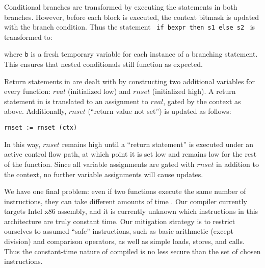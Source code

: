Conditional branches are transformed by executing the statements in both
branches. However, before each block is executed, the context bitmask is updated
with the branch condition. Thus the statement ~\texttt{if bexpr then s1 else
s2}~ is transformed to:
\begin{center}
\end{center}
where \texttt{b} is a fresh temporary variable for each instance of a branching
statement. This ensures that nested conditionals still function as expected.

Return statements in \constc are dealt with by constructing two additional
variables for every function: $rval$ (initialized low) and $rnset$ (initialized
high). A return statement in \constc is translated to an assignment to $rval$,
gated by the context as above.  Additionally, $rnset$ (``return value not set'')
is updated as follows:
\begin{center}
  \texttt{rnset := rnset \band (\bnot ctx)}
\end{center}
In this way, $rnset$ remains high until a ``return statement'' is executed under
an active control flow path, at which point it is set low and remains low for
the rest of the function. Since all variable assignments are gated with $rnset$
in addition to the context, no further variable assignments will cause updates.

We have one final problem: even if two functions execute the same number of
instructions, they can take different amounts of time . Our compiler
currently targets Intel x86 assembly, and it is currently unknown  which instructions in this architecture are truly constant time. Our
mitigation strategy is to restrict ourselves to assumed ``safe'' instructions,
such as basic arithmetic (except division) and comparison operators, as well as
simple loads, stores, and calls. Thus the constant-time nature of compiled
\ccore is no less secure than the set of chosen instructions.
